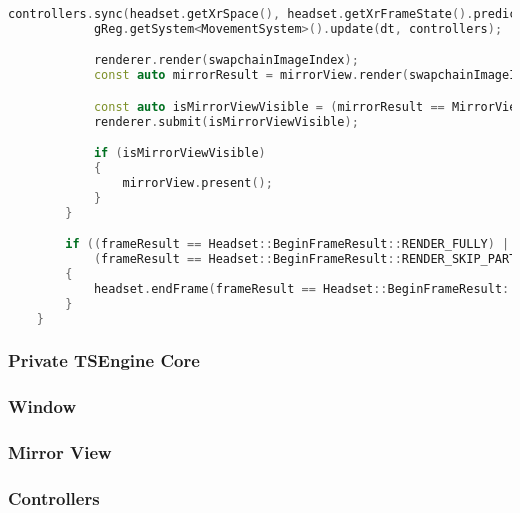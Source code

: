 \begin{lstlisting}[language=c++, caption=Engine's main loop (./engine/src/core/core.cpp)]
            controllers.sync(headset.getXrSpace(), headset.getXrFrameState().predictedDisplayTime);
            gReg.getSystem<MovementSystem>().update(dt, controllers);

            renderer.render(swapchainImageIndex);
            const auto mirrorResult = mirrorView.render(swapchainImageIndex);

            const auto isMirrorViewVisible = (mirrorResult == MirrorView::RenderResult::VISIBLE);
            renderer.submit(isMirrorViewVisible);

            if (isMirrorViewVisible)
            {
                mirrorView.present();
            }
        }

        if ((frameResult == Headset::BeginFrameResult::RENDER_FULLY) ||
            (frameResult == Headset::BeginFrameResult::RENDER_SKIP_PARTIALLY))
        {
            headset.endFrame(frameResult == Headset::BeginFrameResult::RENDER_SKIP_PARTIALLY);
        }
    }
\end{lstlisting}
\newpage
\subsubsection{Private TSEngine Core}
\subsubsection{Window}
\label{sec:window}
\subsubsection{Mirror View}
\label{sec:mirror_view}
\subsubsection{Controllers}
\label{sec:controllers}
